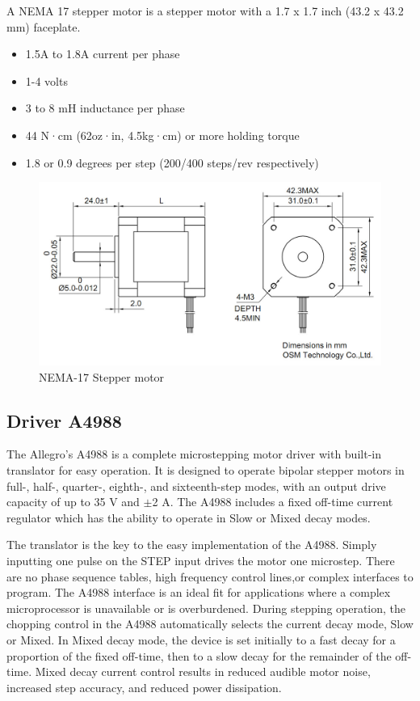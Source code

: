 A NEMA 17 stepper motor is a stepper motor with a 1.7 x 1.7 inch (43.2 x 43.2 mm) faceplate\cite{reprap_nema17_thesis}.
\begin{itemize}
\item 1.5A to 1.8A current per phase
\item 1-4 volts
\item 3 to 8 mH inductance per phase
\item 44 N·cm (62oz·in, 4.5kg·cm) or more holding torque
\item 1.8 or 0.9 degrees per step (200/400 steps/rev respectively)
\end{itemize}
\begin{figure}[H]
	\centering
	\includegraphics[width=\maxwidth{15cm}, keepaspectratio]{Chapters/Fig/nema_17_stepper_motor.jpg}
	\caption{NEMA-17 Stepper motor}
	\label{fig:nema_17_stepper_motor}
\end{figure}

\subsection{Driver A4988}
The Allegro's A4988 is a complete microstepping motor driver with built-in translator for easy operation. It is designed to operate bipolar stepper motors in full-, half-, quarter-, eighth-, and sixteenth-step modes, with an output drive capacity of up to 35 V and $\pm$2 A. The A4988 includes a fixed off-time current regulator which has the ability to operate in Slow or Mixed decay modes\cite{A4988_allegro_thesis}.

The translator is the key to the easy implementation of the A4988. Simply inputting one pulse on the STEP input drives the motor one microstep. There are no phase sequence tables, high frequency control lines,or complex interfaces to program. The A4988 interface is an ideal fit for applications where a complex microprocessor is unavailable or is overburdened. During stepping operation, the chopping control in the A4988 automatically selects the current decay mode, Slow or Mixed. In Mixed decay mode, the device is set initially to a fast decay for a proportion of the fixed off-time, then to a slow decay for the remainder of the off-time. Mixed decay current control results in reduced audible motor noise, increased step accuracy, and reduced power dissipation\cite{A4988_allegro_thesis}.

